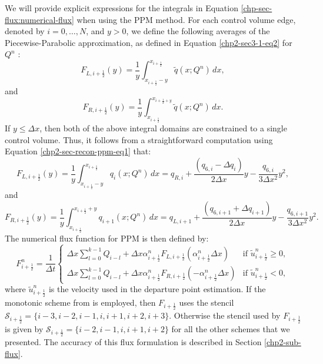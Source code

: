 We will provide explicit expressions for the integrals in Equation \eqref{chp-sec-flux:numerical-flux} 
when using the PPM method. For each control volume edge, denoted by $i=0, \ldots, N$, and $y>0$, 
we define the following averages of the Piecewise-Parabolic approximation, as defined in
Equation \eqref{chp2-sec3-1-eq2} for $Q^{n}$ \citep{colella:1984}:
\begin{equation}
	\label{chp-sec-flux:fL_1}
	F_{L,i+\frac{1}{2}}(y) = \frac{1}{y} \int_{x_{i+\frac{1}{2}}-y}^{x_{i+\frac{1}{2}}}
	\tilde{q}(x;Q^n)\,dx,
\end{equation}
and
\begin{equation}
	\label{chp-sec-flux:fR_1}
	F_{R,i+\frac{1}{2}}(y) = \frac{1}{y} \int_{x_{i+\frac{1}{2}}}^{x_{i+\frac{1}{2}+y}}
	\tilde{q}(x;Q^n)\,dx.
\end{equation}
If $y \leq \Delta x$, then both of the above integral domains
are constrained to a single control volume. Thus,
it follows from a straightforward computation using 
Equation \eqref{chp2-sec-recon-ppm-eq1} that:
\begin{equation}
	\label{chp-sec-flux:fL_2}
	F_{L,i+\frac{1}{2}}(y) = \frac{1}{y} \int_{x_{i+\frac{1}{2}}-y}^{x_{i+\frac{1}{2}}}
	q_{i}(x;Q^n)\,dx = 
	q_{R,i} +\frac{(q_{6,i} - \Delta q_i)}{2\Delta x}y
	- \frac{q_{6,i}}{3\Delta x^2}y^2,
\end{equation}
and
\begin{equation}
	\label{chp-sec-flux:fR_2}
	F_{R,i+\frac{1}{2}}(y) = \frac{1}{y} \int_{x_{i+\frac{1}{2}}}^{x_{i+\frac{1}{2}}+y}
	q_{i+1}(x;Q^n)\,dx = 
	q_{L,i+1} +\frac{(q_{6,i+1} + \Delta q_{i+1})}{2\Delta x}y
	- \frac{q_{6,i+1}}{3\Delta x^2}y^2.
\end{equation}
The numerical flux function for PPM is then defined by:
\begin{equation}
	\label{chp-sec-flux:numerical-flux2}
    F_{i+\frac{1}{2}}^n =  \frac{1}{\Delta t}
    	\begin{cases}
    	\Delta x\sum_{l=0}^{k-1} Q_{i-l} +  
		\Delta x {\alpha}_{i+\frac{1}{2}}^nF_{L,i+\frac{1}{2}}( {\alpha}_{i+\frac{1}{2}}^n\Delta x) & \text{if } \tilde{u}_{i+\frac{1}{2}}^n \geq 0,\\
    	\Delta x\sum_{l=0}^{k-1} Q_{i-l} +  
		\Delta x{\alpha}_{i+\frac{1}{2}}^nF_{R,i+\frac{1}{2}}(-{\alpha}_{i+\frac{1}{2}}^n\Delta x) & \text{if } \tilde{u}_{i+\frac{1}{2}}^n<0,
    	\end{cases}
\end{equation}
where $\tilde{u}_{i+\frac{1}{2}}^n$ is the velocity used in the departure point estimation.
If the monotonic scheme from \citet{lin:2004} is employed, then $F_{i+\frac{1}{2}}$ uses the stencil
$\mathcal{S}_{i+\frac{1}{2}} = \{i-3,i-2,i-1,i,i+1,i+2,i+3\}$.
Otherwise the stencil used by $F_{i+\frac{1}{2}}$ is given by 
$\mathcal{S}_{i+\frac{1}{2}} = \{i-2,i-1,i,i+1,i+2\}$ for all the other schemes that we presented.
The accuracy of this flux formulation is described in Section \ref{chp2-sub-flux}.

